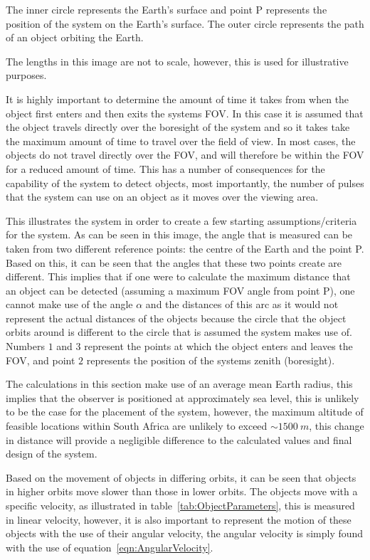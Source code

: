 \documentclass[11pt]{witseiepaper}
\begin{document}
\begin{bibunit}[witseie]
The inner circle represents the Earth's surface and point P represents the position of the system on the Earth's surface.  
The outer circle represents the path of an object orbiting the Earth.

The lengths in this image are not to scale, however, this is used for illustrative purposes.

It is highly important to determine the amount of time it takes from when the object first enters and then exits the systems FOV.
In this case it is assumed that the object travels directly over the boresight of the system and so it takes take the maximum amount of time to travel over the field of view. In most cases, the objects do not travel directly over the FOV, and will therefore be within the FOV for a reduced amount of time. This has a number of consequences for the capability of the system to detect objects, most importantly, the number of pulses that the system can use on an object as it moves over the viewing area.

This illustrates the system in order to create a few starting assumptions/criteria for the system.
As can be seen in this image, the angle that is measured can be taken from two different reference points: the centre of the Earth and the point P. Based on this, it can be seen that the angles that these two points create are different. This implies that if one were to calculate the maximum distance that an object can be detected (assuming a maximum FOV angle from point P), one cannot make use of the angle $\alpha$ and the distances of this arc as it would not represent the actual distances of the objects because the circle that the object orbits around is different to the circle that is assumed the system makes use of.
Numbers $1$ and $3$ represent the points at which the object enters and leaves the FOV, and point $2$ represents the position of the systems zenith (boresight).


The calculations in this section make use of an average mean Earth radius, this implies that the observer is positioned at approximately sea level, this is unlikely to be the case for the placement of the system, however, the maximum altitude of feasible locations within South Africa are unlikely to exceed $\sim 1500~m$, this change in distance will provide a negligible difference to the calculated values and final design of the system.


Based on the movement of objects in differing orbits, it can be seen that objects in higher orbits move slower than those in lower orbits.
The objects move with a specific velocity, as illustrated in table~\ref{tab:ObjectParameters}, this is measured in linear velocity, however, it is also important to represent the motion of these objects with the use of their angular velocity, the angular velocity is simply found with the use of equation~\ref{eqn:AngularVelocity}.


\end{bibunit}
\end{document}
